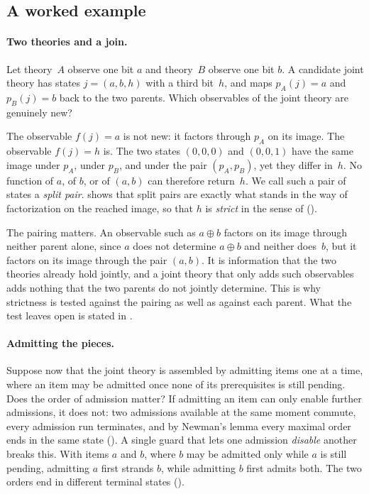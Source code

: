 \subsection{A worked example}
\label{sec:intro-example}

\paragraph{Two theories and a join.}
Let theory~$A$ observe one bit $a$ and theory~$B$ observe one bit $b$. A candidate joint
theory has states $j=(a,b,h)$ with a third bit~$h$, and maps $p_A(j)=a$ and $p_B(j)=b$
back to the two parents. Which observables of the joint theory are genuinely new?

The observable $f(j)=a$ is not new: it factors through $p_A$ on its image. The observable $f(j)=h$ is.
The two states $(0,0,0)$ and $(0,0,1)$ have the same image under $p_A$, under $p_B$, and
under the pair $(p_A,p_B)$, yet they differ in~$h$. No function of $a$, of $b$, or of
$(a,b)$ can therefore return~$h$. We call such a pair of states a \emph{split pair}.
 shows that split pairs are exactly what stands in the way of
factorization on the reached image, so that $h$ is \emph{strict} in the sense of 
().

The pairing matters. An observable such as $a\oplus b$ factors on its image through neither
parent alone, since $a$ does not determine $a\oplus b$ and neither does~$b$, but it
factors on its image through the pair $(a,b)$. It is information that the two theories already hold jointly,
and a joint theory that only adds such observables adds nothing that the two parents do
not jointly determine. This is why strictness is tested against the pairing as well as
against each parent. What the test leaves open is stated in .

\paragraph{Admitting the pieces.}
Suppose now that the joint theory is assembled by admitting items one at a time, where an
item may be admitted once none of its prerequisites is still pending. Does the order of
admission matter? If admitting an item can only enable further admissions, it does not:
two admissions available at the same moment commute, every admission run terminates, and
by Newman's lemma every maximal order ends in the same state (). A
single guard that lets one admission \emph{disable} another breaks this. With items $a$
and $b$, where $b$ may be admitted only while $a$ is still pending, admitting $a$ first
strands $b$, while admitting $b$ first admits both. The two orders end in different
terminal states ().

